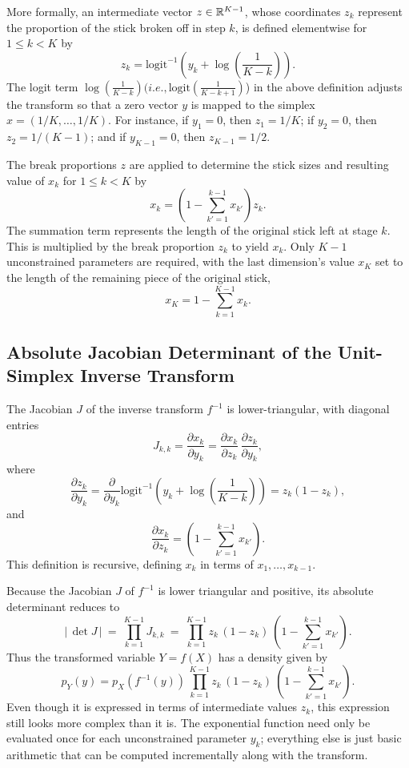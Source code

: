 More formally, an intermediate vector $z \in \reals^{K-1}$, whose
coordinates $z_k$ represent the proportion of the stick broken off in
step $k$, is defined elementwise for $1 \leq k < K$ by
%
\[
z_k = \mbox{logit}^{-1} \left( y_k
                             + \log \left( \frac{1}{K - k}
                                            \right)
                       \right).
\]
%
The logit term
$\log\left(\frac{1}{K-k}\right) (i.e., \mbox{logit}\left(\frac{1}{K-k+1}\right)$) in
the above definition adjusts the transform so that a
zero vector $y$ is mapped to the simplex $x = (1/K,\ldots,1/K)$.  For instance, if
$y_1 = 0$, then $z_1 = 1/K$; if $y_2 = 0$, then $z_2 = 1/(K-1)$; and
if $y_{K-1} = 0$, then $z_{K-1} = 1/2$.

The break proportions $z$ are applied to determine the stick sizes and
resulting value of $x_k$ for $1 \leq k < K$ by
%
\[
x_k =
\left( 1 - \sum_{k'=1}^{k-1} x_{k'} \right) z_k.
\]
%
The summation term represents the length of the original stick left at
stage $k$.  This is multiplied by the break proportion $z_k$ to yield
$x_k$.  Only $K-1$ unconstrained parameters are required, with
the last dimension's value $x_K$ set to the length of the remaining
piece of the original stick,
\[
x_K = 1 - \sum_{k=1}^{K-1} x_k.
\]

\subsection{Absolute Jacobian Determinant of the Unit-Simplex
  Inverse Transform}

The Jacobian $J$ of the inverse transform $f^{-1}$ is
lower-triangular, with diagonal entries
\[
J_{k,k}
=
\frac{\partial x_k}{\partial y_k}
=
\frac{\partial x_k}{\partial z_k} \,
\frac{\partial z_k}{\partial y_k},
\]
%
where
\[
\frac{\partial z_k}{\partial y_k}
= \frac{\partial}{\partial y_k}
   \mbox{logit}^{-1} \left(
                       y_k + \log \left( \frac{1}{K-k}
                                          \right)
                    \right)
= z_k (1 - z_k),
\]
%
and
%
\[
\frac{\partial x_k}{\partial z_k}
=
\left(
  1 - \sum_{k' = 1}^{k-1} x_{k'}
   \right)
.
\]
%
This definition is recursive, defining $x_k$ in terms of
$x_{1},\ldots,x_{k-1}$.

Because the Jacobian $J$ of $f^{-1}$ is lower triangular and positive, its
absolute determinant reduces to
%
\[
\left| \, \det J \, \right|
\ = \
\prod_{k=1}^{K-1} J_{k,k}
\ = \
\prod_{k=1}^{K-1}
z_k
\,
(1 - z_k)
\
\left(
1 - \sum_{k'=1}^{k-1} x_{k'}
\right)
.
\]
%
Thus the transformed variable $Y = f(X)$ has a density given by
%
\[
p_Y(y)
= p_X(f^{-1}(y))
\,
\prod_{k=1}^{K-1}
z_k
\,
(1 - z_k)
\
\left(
1 - \sum_{k'=1}^{k-1} x_{k'}
\right)
.
\]
%
Even though it is expressed in terms of intermediate values $z_k$,
this expression still looks more complex than it is. The exponential
function need only be evaluated once for each unconstrained parameter
$y_k$; everything else is just basic arithmetic that can be computed
incrementally along with the transform.

